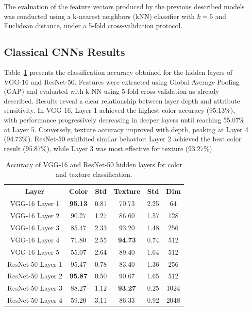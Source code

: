 \documentclass[conference]{IEEEtran}
\begin{document}
The evaluation of the feature vectors produced by the previous described models was conducted using a k-nearest neighbors (kNN) classifier with $k=5$ and Euclidean distance, under a 5-fold cross-validation protocol.


\subsection{Classical CNNs Results}

Table~\ref{tab2} presents the classification accuracy obtained for the hidden layers of VGG-16 and ResNet-50. Features were extracted using Global Average Pooling (GAP) and evaluated with k-NN using 5-fold cross-validation as already described. Results reveal a clear relationship between layer depth and attribute sensitivity. In VGG-16, Layer 1 achieved the highest color accuracy (95.13\%), with performance progressively decreasing in deeper layers until reaching 55.07\% at Layer 5. Conversely, texture accuracy improved with depth, peaking at Layer 4 (94.73\%). ResNet-50 exhibited similar behavior: Layer 2 achieved the best color result (95.87\%), while Layer 3 was most effective for texture (93.27\%).

\begin{table}[htbp]
\caption{Accuracy of VGG-16 and ResNet-50 hidden layers for color and texture classification.}
\begin{center}
\begin{tabular}{c|c|c|c|c|c}
\hline
\textbf{Layer} & \textbf{Color} & \textbf{Std} & \textbf{Texture} & \textbf{Std} & \textbf{Dim}\\
\hline
VGG-16 Layer 1 & \textbf{95.13} & 0.81 & 70.73 & 2.25 & 64 \\
VGG-16 Layer 2 & 90.27 & 1.27 & 86.60 & 1.57 & 128 \\
VGG-16 Layer 3 & 85.47 & 2.33 & 93.20 & 1.48 & 256 \\
VGG-16 Layer 4 & 71.80 & 2.55 & \textbf{94.73} & 0.74 & 512 \\
VGG-16 Layer 5 & 55.07 & 2.64 & 89.40 & 1.64 & 512 \\
ResNet-50 Layer 1 & 95.47 & 0.78 & 83.40 & 1.36 & 256 \\
ResNet-50 Layer 2 & \textbf{95.87} & 0.50 & 90.67 & 1.65 & 512 \\
ResNet-50 Layer 3 & 88.27 & 1.12 & \textbf{93.27} & 0.25 & 1024 \\
ResNet-50 Layer 4 & 59.20 & 3.11 & 86.33 & 0.92 & 2048 \\
\hline
\end{tabular}
\label{tab2}
\end{center}
\end{table}
\end{document}
